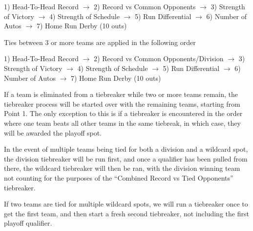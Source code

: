 \begin{deepEnumerate}
\begin{deepEnumerate}
\begin{deepEnumerate}
\begin{deepEnumerate}
\begin{deepEnumerate}
					1) Head-To-Head Record $\rightarrow$  
					2) Record vs Common Opponents $\rightarrow$ 
					3) Strength of Victory $\rightarrow$ 
					4) Strength of Schedule $\rightarrow$ 
					5) Run Differential $\rightarrow$  
					6) Number of Autos $\rightarrow$  
					7) Home Run Derby (10 outs)
				\end{deepEnumerate}
				\item Ties between 3 or more teams are applied in the following order
				\begin{deepEnumerate}
					\item 1) Head-To-Head Record $\rightarrow$  
					2) Record vs Common Opponents/Division $\rightarrow$ 
					3) Strength of Victory $\rightarrow$ 
					4) Strength of Schedule $\rightarrow$ 
					5) Run Differential $\rightarrow$  
					6) Number of Autos $\rightarrow$  
					7) Home Run Derby (10 outs)
					\item If a team is eliminated from a tiebreaker while two or more teams remain, 
					the tiebreaker process will be started over with the remaining teams, starting from Point 1.  The only exception to this is if a tiebreaker is encountered in the order where one team beats all other teams in the same tiebreak, in which case, they will be awarded the playoff spot.
				\end{deepEnumerate}
				\item In the event of multiple teams being tied for both a division and a wildcard spot, 
				the division tiebreaker will be run first, 
				and once a qualifier has been pulled from there, 
				the wildcard tiebreaker will then be ran, 
				with the division winning team not counting 
				for the purposes of the “Combined Record vs Tied Opponents” tiebreaker.
				\item If two teams are tied for multiple wildcard spots, 
				we will run a tiebreaker once to get the first team, 
				and then start a fresh second tiebreaker, 
				not including the first playoff qualifier.
			\end{deepEnumerate}
		\end{deepEnumerate}
	\end{deepEnumerate}
\end{deepEnumerate}

